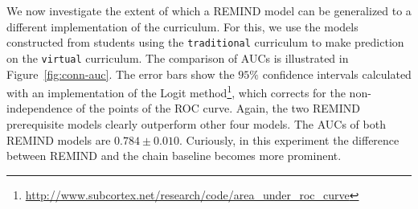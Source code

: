\documentclass{edm_template}
\begin{document}
{	We now investigate the extent of which a REMIND model can be generalized to a different implementation of the curriculum. 
	For this, we use the models constructed from students using the \texttt{traditional} curriculum  to make prediction on the \texttt{virtual} curriculum.
	The comparison of AUCs is illustrated in Figure~\ref{fig:conn-auc}.
	The error bars show the $95\%$ confidence intervals calculated with an implementation of 
	the Logit method\footnote{\url{http://www.subcortex.net/research/code/area_under_roc_curve}}, 
	which corrects for the non-independence of the points of the ROC curve.
	Again, the two REMIND prerequisite models clearly outperform other four models. 
	The AUCs of both REMIND models are $0.784\pm0.010$.
	Curiously, in this experiment the difference between REMIND and the chain baseline becomes more prominent.
	
}
\end{document}

